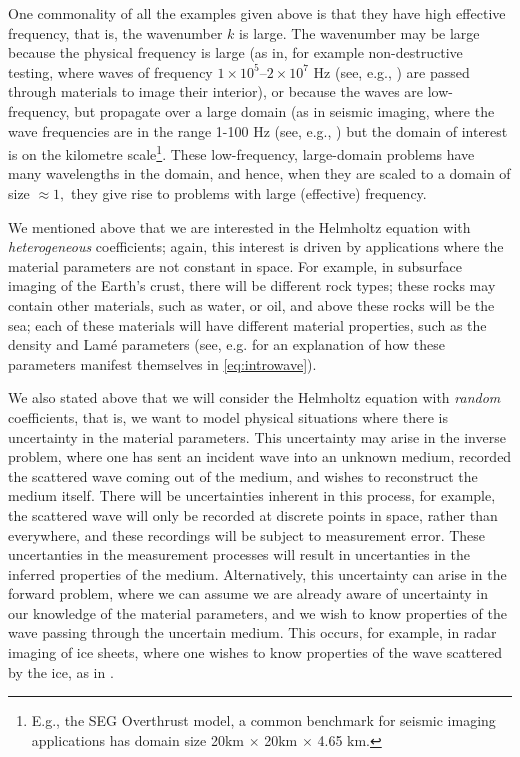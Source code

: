 One commonality of all the examples given above is that they have high effective frequency, that is, the wavenumber $k$ is large. The wavenumber may be large because the physical frequency is large (as in, for example non-destructive testing, where waves of frequency $1\times10^5$--$2\times10^7$ Hz (see, e.g., \cite{Bi}) are passed through materials to image their interior), or because the waves are low-frequency, but propagate over a large domain (as in seismic imaging, where the wave frequencies are in the range 1-100 Hz (see, e.g., \cite{Sc}) but the domain of interest is on the kilometre scale\footnote{E.g., the SEG Overthrust model, a common benchmark for seismic imaging applications has domain size 20km $\times$ 20km $\times$ 4.65 km.}. These low-frequency, large-domain problems have many wavelengths in the domain, and hence, when they are scaled to a domain of size $\approx 1,$ they give rise to problems with large (effective) frequency.

We mentioned above that we are interested in the Helmholtz equation with \emph{heterogeneous} coefficients; again, this interest is driven by applications where the material parameters are not constant in space. For example, in subsurface imaging of the Earth's crust, there will be different rock types; these rocks may contain other materials, such as water, or oil, and above these rocks will be the sea; each of these materials will have different material properties, such as the density and Lam\'e parameters (see, e.g. \cite[Section 1.2.4]{Ch:15} for an explanation of how these parameters manifest themselves in \eqref{eq:introwave}).

We also stated above that we will consider the Helmholtz equation with \emph{random} coefficients, that is, we want to model physical situations where there is uncertainty in the material parameters. This uncertainty may arise in the inverse problem, where one has sent an incident wave into an unknown medium, recorded the scattered wave coming out of the medium, and wishes to reconstruct the medium itself. There will be uncertainties inherent in this process, for example, the scattered wave will only be recorded at discrete points in space, rather than everywhere, and these recordings will be subject to measurement error. These uncertanties in the measurement processes will result in uncertanties in the inferred properties of the medium. Alternatively, this uncertainty can arise in the forward problem, where we can assume we are already aware of uncertainty in our knowledge of the material parameters, and we wish to know properties of the wave passing through the uncertain medium. This occurs, for example, in radar imaging of ice sheets, where one wishes to know properties of the wave scattered by the ice, as in \cite{JiPi:18}.


